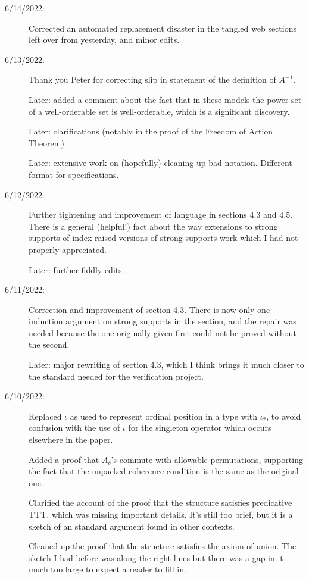 \documentclass[112pt]{article}
\begin{document}
\begin{description}

\item[6/14/2022:]  Corrected an automated replacement disaster in the tangled web sections left over from yesterday, and minor edits.

\item[6/13/2022:]  Thank you Peter for correcting slip in statement of the definition of $A^{-1}$.

Later:  added a comment about the fact that in these models the power set of a well-orderable set is well-orderable, which is a significant discovery.

Later:  clarifications (notably in the proof of the Freedom of Action Theorem) 

Later:  extensive work on (hopefully) cleaning up bad notation.  Different format for specifications.

\item[6/12/2022:]  Further tightening and improvement of language in sections 4.3 and 4.5.  There is a general (helpful!) fact about the way extensions to strong supports of index-raised versions of strong supports work which I had not properly appreciated.

Later: further fiddly edits.

\item[6/11/2022:]  Correction and improvement of section 4.3.  There is now only one induction argument on strong supports in the section, and the repair was needed because the one originally given first could not be proved without the second.

Later:  major rewriting of section 4.3, which I think brings it much closer to the standard needed for the verification project.

\item[6/10/2022:]  Replaced $\iota$ as used to represent ordinal position in a type with $\iota_*$, to avoid confusion with the use of $\iota$ for the singleton operator which occurs elsewhere in the paper.

Added a proof that $A_\delta$'s commute with allowable permutations, supporting the fact that the unpacked coherence condition is the same as the original one.

Clarified the account of the proof that the structure satisfies predicative TTT, which was missing important details.   It's still too brief, but it is a sketch of an standard argument found in other contexts.

Cleaned up the proof that the structure satisfies the axiom of union.  The sketch I had before was along the right lines but there was a gap in it much too large to expect a reader to fill in.


\end{description}
\end{document}
